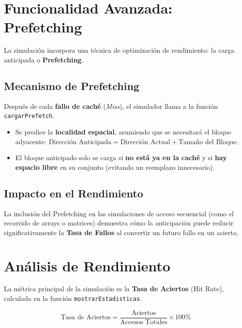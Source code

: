 \documentclass[12pt, a4paper]{article}
\begin{document}
\section{Funcionalidad Avanzada: Prefetching}
\label{sec:prefetch}

La simulación incorpora una técnica de optimización de rendimiento: la carga anticipada o \textbf{Prefetching}.

\subsection{Mecanismo de Prefetching}
Después de cada \textbf{fallo de caché} (\textit{Miss}), el simulador llama a la función \texttt{cargarPrefetch}.
\begin{itemize}[label=$\checkmark$]
    \item Se predice la \textbf{localidad espacial}, asumiendo que se necesitará el bloque adyacente: $\text{Dirección Anticipada} = \text{Dirección Actual} + \text{Tamaño del Bloque}$.
    \item El bloque anticipado solo se carga si \textbf{no está ya en la caché} y si \textbf{hay espacio libre} en su conjunto (evitando un reemplazo innecesario).
\end{itemize}

\subsection{Impacto en el Rendimiento}
La inclusión del Prefetching en las simulaciones de acceso secuencial (como el recorrido de arrays o matrices) demuestra cómo la anticipación puede reducir significativamente la \textbf{Tasa de Fallos} al convertir un futuro fallo en un acierto.

\section{Análisis de Rendimiento}
\label{sec:analisis}

La métrica principal de la simulación es la \textbf{Tasa de Aciertos} (Hit Rate), calculada en la función \texttt{mostrarEstadisticas}.

\[ \text{Tasa de Aciertos} = \frac{\text{Aciertos}}{\text{Accesos Totales}} \times 100\% \]
\end{document}
